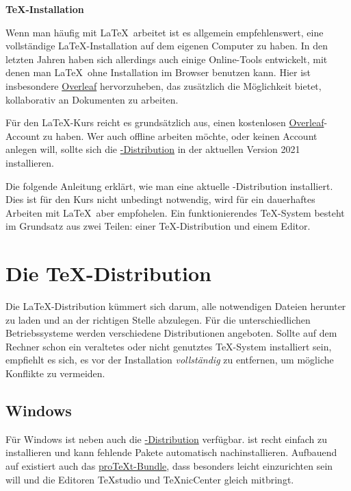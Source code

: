 \documentclass[
	ausgabe=2022-02-07,
	titel=Installationshinweise,
	shortverb=true,
]{../tex/latexkurs-exercise}
\begin{document}
\begin{center}
\sffamily\bfseries\Large \TeX-Installation
\end{center}

\noindent Wenn man häufig mit \LaTeX\ arbeitet ist es allgemein empfehlenswert, eine vollständige \LaTeX-Installation auf dem eigenen Computer zu haben. In den letzten Jahren haben sich allerdings auch einige Online-Tools entwickelt, mit denen man \LaTeX\ ohne Installation im Browser benutzen kann. Hier ist insbesondere \href{https://qn3.de/tex00}{Overleaf} hervorzuheben, das zusätzlich die Möglichkeit bietet, kollaborativ an Dokumenten zu arbeiten.

Für den \LaTeX-Kurs reicht es grundsätzlich aus, einen kostenlosen \href{https://qn3.de/tex00}{Overleaf}-Account zu haben. Wer auch offline arbeiten möchte, oder keinen Account anlegen will, sollte sich die \href{https://www.tug.org/texlive/}{\TeXlive-Distribution} in der aktuellen Version 2021 installieren.

Die folgende Anleitung erklärt, wie man eine aktuelle \TeXlive-Distribution installiert. Dies ist für den Kurs nicht unbedingt notwendig, wird für ein dauerhaftes Arbeiten mit \LaTeX\ aber empfohelen. Ein funktionierendes \TeX-System besteht im Grundsatz aus zwei Teilen: einer \TeX-Distribution und einem Editor.


\section{Die \TeX-Distribution}



Die \LaTeX-Distribution kümmert sich darum, alle notwendigen Dateien herunter zu laden und an der richtigen Stelle abzulegen. Für die unterschiedlichen Betriebssysteme werden verschiedene Distributionen angeboten. Sollte auf dem Rechner schon ein veraltetes oder nicht genutztes \TeX-System installiert sein, empfiehlt es sich, es vor der Installation \emph{vollständig} zu entfernen, um mögliche Konflikte zu vermeiden.

\subsection*{Windows}
Für Windows ist neben \href{https://www.tug.org/texlive/}{\TeXlive} auch die \href{https://miktex.org/}{\MikTeX-Distribution} verfügbar. \MikTeX ist recht einfach zu installieren und kann fehlende Pakete automatisch nachinstallieren. Aufbauend auf \MikTeX existiert auch das \href{https://www.tug.org/protext/}{pro\TeX t-Bundle}, dass besonders leicht einzurichten sein will und die Editoren \TeX studio und \TeX nicCenter gleich mitbringt.
\end{document}
